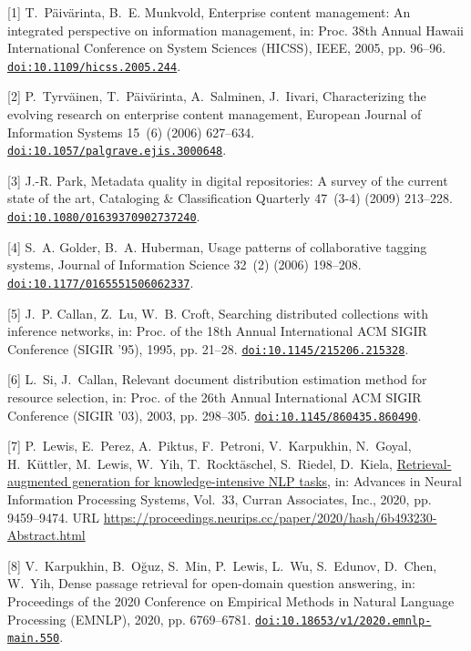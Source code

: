 [1] T.~P{\"a}iv{\"a}rinta, B.~E. Munkvold, Enterprise content management: An integrated perspective on information management, in: Proc. 38th Annual Hawaii International Conference on System Sciences (HICSS), IEEE, 2005, pp. 96--96. \href {https://doi.org/10.1109/hicss.2005.244} {\texttt{doi:10.1109/hicss.2005.244}}.

[2] P.~Tyrv{\"a}inen, T.~P{\"a}iv{\"a}rinta, A.~Salminen, J.~Iivari, Characterizing the evolving research on enterprise content management, European Journal of Information Systems 15~(6) (2006) 627--634. \href {https://doi.org/10.1057/palgrave.ejis.3000648} {\texttt{doi:10.1057/palgrave.ejis.3000648}}.

[3] J.-R. Park, Metadata quality in digital repositories: A survey of the current state of the art, Cataloging \& Classification Quarterly 47~(3-4) (2009) 213--228. \href {https://doi.org/10.1080/01639370902737240} {\texttt{doi:10.1080/01639370902737240}}.

[4] S.~A. Golder, B.~A. Huberman, Usage patterns of collaborative tagging systems, Journal of Information Science 32~(2) (2006) 198--208. \href {https://doi.org/10.1177/0165551506062337} {\texttt{doi:10.1177/0165551506062337}}.

[5] J.~P. Callan, Z.~Lu, W.~B. Croft, Searching distributed collections with inference networks, in: Proc. of the 18th Annual International ACM SIGIR Conference (SIGIR '95), 1995, pp. 21--28. \href {https://doi.org/10.1145/215206.215328} {\texttt{doi:10.1145/215206.215328}}.

[6] L.~Si, J.~Callan, Relevant document distribution estimation method for resource selection, in: Proc. of the 26th Annual International ACM SIGIR Conference (SIGIR '03), 2003, pp. 298--305. \href {https://doi.org/10.1145/860435.860490} {\texttt{doi:10.1145/860435.860490}}.

[7] P.~Lewis, E.~Perez, A.~Piktus, F.~Petroni, V.~Karpukhin, N.~Goyal, H.~K{\"u}ttler, M.~Lewis, W.~Yih, T.~Rockt{\"a}schel, S.~Riedel, D.~Kiela, \href{https://proceedings.neurips.cc/paper/2020/hash/6b493230-Abstract.html}{Retrieval-augmented generation for knowledge-intensive {NLP} tasks}, in: Advances in Neural Information Processing Systems, Vol.~33, Curran Associates, Inc., 2020, pp. 9459--9474. URL \url{https://proceedings.neurips.cc/paper/2020/hash/6b493230-Abstract.html}

[8] V.~Karpukhin, B.~O{\u{g}}uz, S.~Min, P.~Lewis, L.~Wu, S.~Edunov, D.~Chen, W.~Yih, Dense passage retrieval for open-domain question answering, in: Proceedings of the 2020 Conference on Empirical Methods in Natural Language Processing ({EMNLP}), 2020, pp. 6769--6781. \href {https://doi.org/10.18653/v1/2020.emnlp-main.550} {\texttt{doi:10.18653/v1/2020.emnlp-main.550}}.

